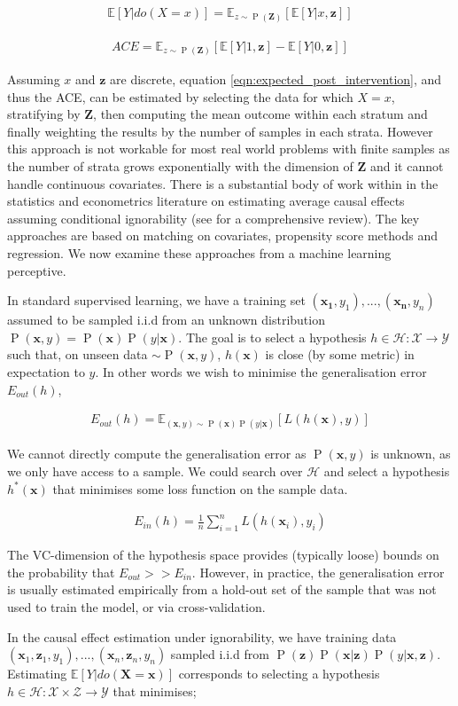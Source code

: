 \documentclass[11pt,a4paper,twoside]{report}
\newcommand{\vb}[1]{\boldsymbol{#1}}
\newcommand{\Esub}[2]{\mathbb E_{#1}\left[{#2}\right]}
\newcommand{\E}[1]{\mathbb E\left[{#1}\right]}
\newcommand{\eqn}[1]{\begin{align}#1\end{align}}
\renewcommand{\P}[1]{\operatorname{P}\left(#1\right)}
\theoremstyle{plain}
\theoremstyle{definition}
\begin{document}
\eqn{
\label{eqn:expected_post_intervention}
\E{Y|do(X=x)} = \Esub{z\sim \P{\vb{Z}}}{\E{Y|x,\vb{z}}}
} 

\eqn{
\label{eqn:ace_ignoreable}
ACE = \Esub{z\sim \P{\vb{Z}}}{\E{Y|1,\vb{z}}-\E{Y|0,\vb{z}}}
}  

Assuming $x$ and $\vb{z}$ are discrete, equation \ref{eqn:expected_post_intervention}, and thus the ACE, can be estimated by selecting the data for which $X=x$, stratifying by $\vb{Z}$, then computing the mean outcome within each stratum and finally weighting the results by the number of samples in each strata. However this approach is not workable for most real world problems with finite samples as the number of strata grows exponentially with the dimension of $\vb{Z}$ and it cannot handle continuous covariates. There is a substantial body of work within in the statistics and econometrics literature on estimating average causal effects assuming conditional ignorability (see \citet{Imbens2004} for a comprehensive review). The key approaches are based on matching on covariates, propensity score methods and regression. We now examine these approaches from a machine learning perceptive. 

In standard supervised learning, we have a training set $(\vb{x_1},y_1),...,(\vb{x_n},y_n)$ assumed to be sampled i.i.d from an unknown distribution $\P{\vb{x},y} =\P{\vb{x}}\P{y|\vb{x}}$. The goal is to select a hypothesis $h \in \mathcal{H} : \mathcal{X} \rightarrow \mathcal{Y}$ such that, on unseen data $ \sim \P{\vb{x},y}$, $h(\vb{x})$ is close (by some metric) in expectation to $y$. In other words we wish to minimise the generalisation error $E_{out}(h)$,

\eqn{
E_{out}(h) = \Esub{(\vb{x},y)\sim \P{\vb{x}}\P{y|\vb{x}}}{L(h(\vb{x}),y)}
}

We cannot directly compute the generalisation error as $\P{\vb{x},y}$ is unknown, as we only have access to a sample. We could search over $\mathcal{H}$ and select a hypothesis $h^*(\vb{x})$ that minimises some loss function on the sample data.

\eqn{
E_{in}(h) = \frac{1}{n}\sum_{i=1}^n L(h(\vb{x}_i),y_i)
}

The VC-dimension of the hypothesis space provides (typically loose) bounds on the probability that $E_{out} >> E_{in}$. However, in practice, the generalisation error is usually estimated empirically from a hold-out set of the sample that was not used to train the model, or via cross-validation. 

In the causal effect estimation under ignorability, we have training data $(\vb{x}_1,\vb{z}_1,y_1),...,(\vb{x}_n,\vb{z}_n,y_n)$ sampled i.i.d from $\P{\vb{z}}\P{\vb{x}|\vb{z}}\P{y|\vb{x},\vb{z}}$. Estimating $\E{Y|do(\vb{X}=\vb{x})}$ corresponds to selecting a hypothesis $h \in \mathcal{H}:\mathcal{X} \times \mathcal{Z} \rightarrow \mathcal{Y}$ that minimises;
\end{document}
